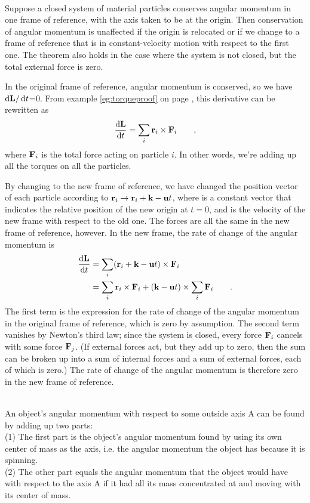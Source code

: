 \noindent{}\\
 Suppose a closed system of material particles conserves
angular momentum in one frame of reference, with the axis taken to be
at the origin. Then conservation of angular momentum is unaffected if the origin
is relocated or if we change to a frame of reference that is in constant-velocity
motion with respect to the first one. The theorem also holds in the case where the system is not
closed, but the total external force is zero.\label{choiceofaxisproof}

 In the original frame of reference, angular momentum is
conserved, so we have $\operatorname{d\!}\textbf{L}/\operatorname{d\!} t$=0.
From example \ref{eg:torqueproof} on page \pageref{eg:torqueproof}, this
derivative can be rewritten as
\begin{equation*}
		\frac{\operatorname{d\!}\textbf{L}}{\operatorname{d\!} t}	= \sum_i  \textbf{r}_i\times\textbf{F}_i \qquad ,
\end{equation*}
where $\textbf{F}_i$ is the total force acting on particle $i$. In other words, we're
adding up all the torques on all the particles. 

By changing to the new frame of reference, we have changed
the position vector of each particle according to $\textbf{r}_i \rightarrow \textbf{r}_i+\textbf{k}-\textbf{u}t$,
where  is a constant vector that indicates the relative position of the new
origin at $t=0$, and  is the velocity of the new frame with respect to the old one.
The forces are all the same in the new frame of reference, however.
In the new frame, the rate of change of the angular momentum is
\begin{align*}
		\frac{\operatorname{d\!}\textbf{L}}{\operatorname{d\!} t}	&= \sum_i
				(\textbf{r}_i+\textbf{k}-\textbf{u}t)\times\textbf{F}_i \\
		&= \sum_i \textbf{r}_i\times\textbf{F}_i
			+ (\textbf{k}-\textbf{u}t) \times \sum_i \textbf{F}_i \qquad .
\end{align*}
The first term is the expression for the rate of change of the angular
momentum in the original frame of reference, which is zero by
assumption. The second term vanishes by Newton's third law; since the system is
closed, every force $\textbf{F}_i$ cancels with some force $\textbf{F}_j$.
(If external forces act, but they add up to zero, then the sum can be
broken up into a sum of internal forces and a sum of external forces, each of
which is zero.)
The rate of change of the angular momentum is therefore zero
in the new frame of reference.

\noindent{}\\
 An object's angular momentum
with respect to some outside axis A can be found by adding up
two parts:\\
(1) The first part is the object's angular momentum found by using
its own center of mass as the axis, i.e. the angular momentum the object
has because it is spinning.\\
(2) The other part equals the angular momentum that the object
would have with respect to the axis A if it had all its mass
concentrated at and moving with its center of mass.

